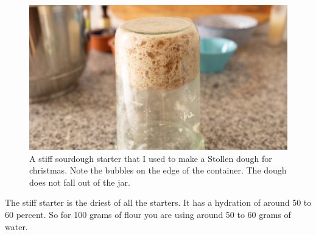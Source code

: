\begin{figure}[!htb]
  \includegraphics[width=\textwidth]{sourdough-starter-stiff.jpg}
  \caption{A stiff sourdough starter that I used to make a Stollen dough for christmas. Note
  the bubbles on the edge of the container. The dough does not fall out of the jar.}
  \label{fig:stiff-sourdough-starter}
\end{figure}

The stiff starter is the driest of all the starters. It has a hydration of
around 50 to 60 percent. So for 100 grams of flour you are using around 50 to
60 grams of water.

